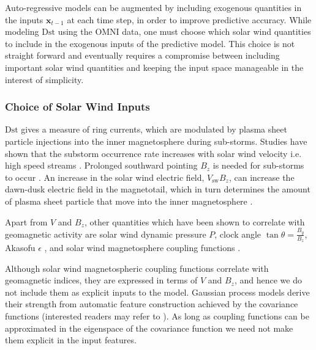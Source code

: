 Auto-regressive models can be augmented by including exogenous quantities in the inputs 
$\mathbf{x}_{t-1}$ at each time step, in order to improve predictive accuracy. While modeling 
$\mathrm{Dst}$ using the OMNI data, one must choose which solar wind quantities to include in the 
exogenous inputs of the predictive model. This choice is not straight forward and eventually 
requires a compromise between including important solar wind quantities and keeping the input 
space manageable in the interest of simplicity.

\subsubsection{Choice of Solar Wind Inputs}

$\mathrm{Dst}$ gives a measure of ring currents, which are modulated by plasma sheet particle 
injections into the inner magnetosphere during sub-storms. Studies have shown that the substorm 
occurrence rate increases with solar wind velocity i.e. high speed streams 
\citep{Kissinger2011,Newell2016}. Prolonged southward pointing $B_z$ is needed 
for sub-storms to occur \citep{McPherron1986}. An increase in the solar wind electric field, 
$V_{\text{sw}}B_z$, can increase the dawn-dusk electric field in the magnetotail, which in turn 
determines the amount of plasma sheet particle that move into the inner magnetosphere 
\citep{Friedel2001}. 

Apart from $V$ and $B_z$, other quantities which have been shown to correlate with geomagnetic 
activity are solar wind dynamic pressure $P$, clock angle $\tan \theta = \frac{B_y}{B_z}$, Akasofu 
$\epsilon$ \citep{1986AkasofuE}, and solar wind magnetosphere coupling functions 
\citep{JGRA:JGRA21451}. 

Although solar wind magnetospheric coupling functions correlate with 
geomagnetic indices, they are expressed in terms of $V$ and $B_z$, and hence we do not include them 
as explicit inputs to the model. Gaussian process models derive their strength from 
automatic feature construction achieved by the covariance functions (interested readers may refer 
to \citet[ch.~6 \& 7]{Rasmussen:2005:GPM:1162254}). As long as coupling functions can be 
approximated in the eigenspace of the covariance function we need not make them explicit in 
the input features. 


